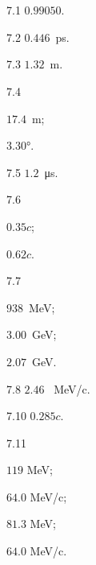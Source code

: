 \protect \section *{\protect {}}
\begin{Solution}{7.{1}}
		$0.990 50$.
	
\end{Solution}
\begin{Solution}{7.{2}}
		$0.446$~\si{\pico\second}.
	
\end{Solution}
\begin{Solution}{7.{3}}
		$1.32$~m.
	
\end{Solution}
\begin{Solution}{7.{4}}
		\begin{enumerate*}[label=(\alph*)]
			\item $17.4$~m;
			\item \ang{3.30}.
		\end{enumerate*}
	
\end{Solution}
\begin{Solution}{7.{5}}
		$1.2$~\si{\micro\second}.
	
\end{Solution}
\begin{Solution}{7.{6}}
		\begin{enumerate*}[label=(\alph*)]
			\item $0.35c$;
			\item $0.62c$.
		\end{enumerate*}
	
\end{Solution}
\begin{Solution}{7.{7}}
		\begin{enumerate*}[label=(\alph*)]
			\item $938$~MeV;
			\item $3.00$~GeV;
			\item $2.07$~GeV.
		\end{enumerate*}
	
\end{Solution}
\begin{Solution}{7.{8}}
		$2.46$~ MeV/c.
	
\end{Solution}
\begin{Solution}{7.{10}}
		$0.285c$.
	
\end{Solution}
\begin{Solution}{7.{11}}
		\begin{enumerate*}[label=(\alph*)]
			\item $119$ MeV;
			\item $64.0$ MeV/c;
			\item $81.3$ MeV;
			\item $64.0$ MeV/c.
		\end{enumerate*}
	
\end{Solution}
